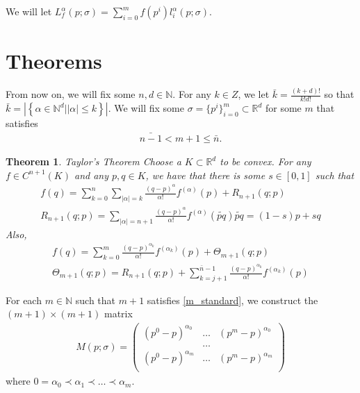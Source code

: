 \documentclass{article}
\newtheorem{theorem}{Theorem}[section]
\theoremstyle{case}
\newcommand{\naturals}{\mathbb N}
\newcommand{\natsd}{\naturals^d}
\begin{document}
We will let 
$L^{\alpha}_f(p; \sigma) = \sum_{i=0}^m f(p^i)l_i^{\alpha}(p; \sigma)$.


\section{Theorems}
From now on, we will fix some $n, d \in \mathbb N$.
For any $k \in Z$, we let $\bar k = \frac{(k + d)!}{k!d!}$ so that $\bar k = \left|\left\{\alpha \in \natsd \big| \left|\alpha\right| \le k \right\}\right|$.
We will fix some $\sigma = \{p^i\}^m_{i=0} \subset \mathbb R^d$ for some $m$ that satisfies 
\begin{align}
\bar{n-1} < m+1 \le \bar n. \label{m_standard}
\end{align}


\begin{theorem}{Taylor's Theorem}
Choose a $K\subset \mathbb R^ d$ to be convex.
For any $f \in C^{n+1}(K)$ and any $p, q \in K$, we have that there is some $s \in [0,1]$ such that
\begin{align*}
f(q) = \sum_{k=0}^n \sum_{|\alpha| = k} \frac{\left(q - p\right)^{\alpha}}{\alpha!}f^{(\alpha)}(p) + R_{n+1}(q; p) \\
R_{n+1}(q; p) = \sum_{|\alpha|=n+1}\frac{\left(q - p\right)^{\alpha}}{\alpha!} f^{(\alpha)}(\tilde{pq})
\tilde{pq} = (1-s)p + sq
\end{align*}
Also,
\begin{align*}
f(q) = \sum_{k=0}^m \frac{\left(q - p\right)^{\alpha_k}}{\alpha!}f^{(\alpha_k)}(p) + \Theta_{m+1}(q; p) \\
\Theta_{m+1}(q; p) = R_{n+1}(q; p) + \sum_{k=j+1}^{\bar n - 1} \frac{\left(q - p\right)^{\alpha_k}}{\alpha!}f^{(\alpha_k)}(p) 
\end{align*}
\end{theorem}

For each $m \in \naturals$ such that $m+1$ satisfies \cref{m_standard}, we construct the $(m+1) \times (m+1)$ matrix 
\begin{align*}
M(p; \sigma) = \begin{pmatrix}
\left(p^0 - p\right)^{\alpha_0} & \ldots & \left(p^m - p\right)^{\alpha_0} \\
&\ldots & \\
\left(p^0 - p\right)^{\alpha_m} & \ldots & \left(p^m - p\right)^{\alpha_m} \\
\end{pmatrix}
\end{align*}
where $0 = \alpha_0 \prec \alpha_1 \prec \ldots \prec \alpha_m$.
\end{document}
